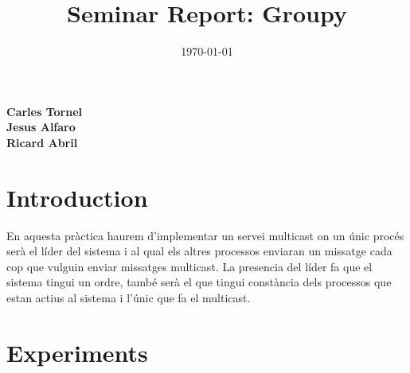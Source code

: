 \documentclass[a4paper, 10pt]{article}
\title{Seminar Report: Groupy}
\date{\normalsize\today{}}
\begin{document}
\author{}
\maketitle

\begin{center}
  \textbf{Carles Tornel}\\
  \textbf{Jesus Alfaro}\\
  \textbf{Ricard Abril}

\end{center}
\section{Introduction}

En aquesta pràctica haurem d'implementar un servei multicast on un únic procés serà el líder del sistema i al qual els altres processos enviaran un missatge cada cop que vulguin enviar missatges multicast.
La presencia del líder fa que el sistema tingui un ordre, també serà el que tingui constància dels processos que estan actius al sistema i l'únic que fa el multicast.
\newpage\section{Experiments}
\end{document}
